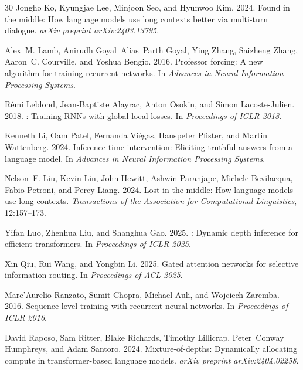 \documentclass[11pt]{article}
\begin{document}
\begin{thebibliography}{30}
Jongho Ko, Kyungjae Lee, Minjoon Seo, and Hyunwoo Kim. 2024.
\newblock Found in the middle: How language models use long contexts better via multi-turn dialogue.
\newblock \emph{arXiv preprint arXiv:2403.13795}.

Alex~M. Lamb, Anirudh Goyal~Alias~Parth Goyal, Ying Zhang, Saizheng Zhang, Aaron~C. Courville, and Yoshua Bengio. 2016.
\newblock Professor forcing: A new algorithm for training recurrent networks.
\newblock In \emph{Advances in Neural Information Processing Systems}.

R{\'e}mi Leblond, Jean-Baptiste Alayrac, Anton Osokin, and Simon Lacoste-Julien. 2018.
: Training {RNNs} with global-local losses.
\newblock In \emph{Proceedings of ICLR 2018}.

Kenneth Li, Oam Patel, Fernanda Vi{\'e}gas, Hanspeter Pfister, and Martin Wattenberg. 2024.
\newblock Inference-time intervention: Eliciting truthful answers from a language model.
\newblock In \emph{Advances in Neural Information Processing Systems}.

Nelson~F. Liu, Kevin Lin, John Hewitt, Ashwin Paranjape, Michele Bevilacqua, Fabio Petroni, and Percy Liang. 2024.
\newblock Lost in the middle: How language models use long contexts.
\newblock \emph{Transactions of the Association for Computational Linguistics}, 12:157--173.

Yifan Luo, Zhenhua Liu, and Shanghua Gao. 2025.
: Dynamic depth inference for efficient transformers.
\newblock In \emph{Proceedings of ICLR 2025}.

Xin Qiu, Rui Wang, and Yongbin Li. 2025.
\newblock Gated attention networks for selective information routing.
\newblock In \emph{Proceedings of ACL 2025}.

Marc'Aurelio Ranzato, Sumit Chopra, Michael Auli, and Wojciech Zaremba. 2016.
\newblock Sequence level training with recurrent neural networks.
\newblock In \emph{Proceedings of ICLR 2016}.

David Raposo, Sam Ritter, Blake Richards, Timothy Lillicrap, Peter~Conway Humphreys, and Adam Santoro. 2024.
\newblock Mixture-of-depths: Dynamically allocating compute in transformer-based language models.
\newblock \emph{arXiv preprint arXiv:2404.02258}.


\end{thebibliography}
\end{document}
